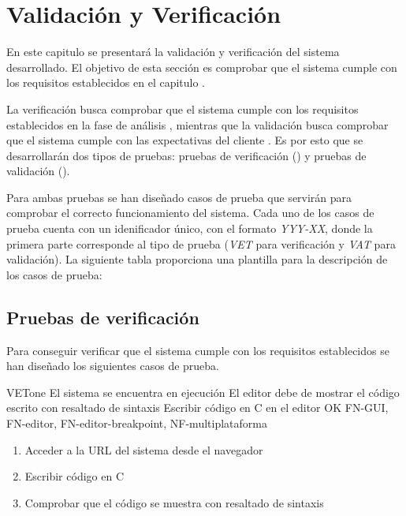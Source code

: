 \chapter{Validación y Verificación}\label{chap:validacion}

En este capitulo se presentará la validación y verificación del sistema desarrollado. El objetivo de esta sección es comprobar que el sistema cumple con los requisitos establecidos en el capitulo . 

La verificación busca comprobar que el sistema cumple con los requisitos establecidos en la fase de análisis \cite{IEEE-Validation-Verification}, mientras que la validación busca comprobar que el sistema cumple con las expectativas del cliente \cite{IEEE-Validation-Verification}. 
Es por esto que se desarrollarán dos tipos de pruebas: pruebas de verificación () y pruebas de validación (). 

Para ambas pruebas se han diseñado casos de prueba que servirán para comprobar el correcto funcionamiento del sistema. Cada uno de los casos de prueba cuenta con un idenificador único, con el formato \textit{YYY-XX}, donde la primera parte corresponde al tipo de prueba (\textit{VET} para verificación y \textit{VAT} para validación). La siguiente tabla proporciona una plantilla para la descripción de los casos de prueba:

\printtesttemplate

\section{Pruebas de verificación}\label{sec:verificacion}

Para conseguir verificar que el sistema cumple con los requisitos establecidos se han diseñado los siguientes casos de prueba.

    \begin{testCase}{VET}{one}
    {El sistema se encuentra en ejecución}
    {El editor debe de mostrar el código escrito con resaltado de sintaxis}
    {Escribir código en C en el editor}
    {OK}
    {FN-GUI, FN-editor, FN-editor-breakpoint, NF-multiplataforma}
    \begin{enumerate}
        \item Acceder a la URL del sistema desde el navegador
        \item Escribir código en C
        \item Comprobar que el código se muestra con resaltado de sintaxis
    \end{enumerate}
    \end{testCase}

